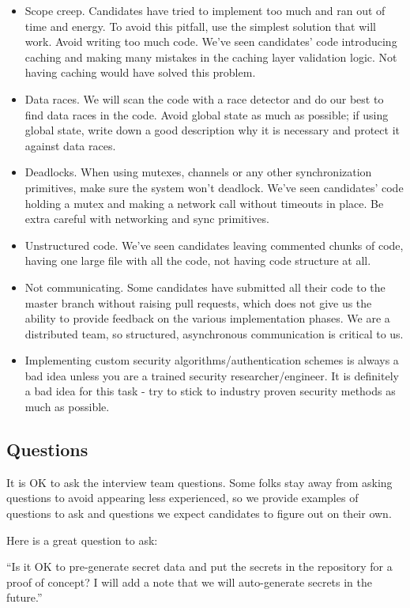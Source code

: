 \documentclass{article}
\begin{document}
    \begin{itemize}
    \item Scope creep. Candidates have tried to implement too much and ran out of time and energy. To avoid this pitfall, use the simplest solution that will work. Avoid writing too much code. We've seen candidates' code introducing caching and making many mistakes in the caching layer validation logic. Not having caching would have solved this problem.
    \item Data races. We will scan the code with a race detector and do our best to find data races in the code. Avoid global state as much as possible; if using global state, write down a good description why it is necessary and protect it against data races.
    \item Deadlocks. When using mutexes, channels or any other synchronization primitives, make sure the system won't deadlock. We've seen candidates' code holding a mutex and making a network call without timeouts in place. Be extra careful with networking and sync primitives.
    \item Unstructured code. We've seen candidates leaving commented chunks of code, having one large file with all the code, not having code structure at all.
    \item Not communicating. Some candidates have submitted all their code to the master branch without raising pull requests, which does not give us the ability to provide feedback on the various implementation phases. We are a distributed team, so structured, asynchronous communication is critical to us.
    \item Implementing custom security algorithms/authentication schemes is always a bad idea unless you are a trained security researcher/engineer. It is definitely a bad idea for this task - try to stick to industry proven security methods as much as possible.
    \end{itemize}

\subsection{Questions}

It is OK to ask the interview team questions. Some folks stay away from
asking questions to avoid appearing less experienced, so we provide examples of questions
to ask and questions we expect candidates to figure out on their own.

Here is a great question to ask:

``Is it OK to pre-generate secret data and put the secrets in the repository for a proof of concept? I will add a note that we will auto-generate secrets in the future.''
\end{document}
